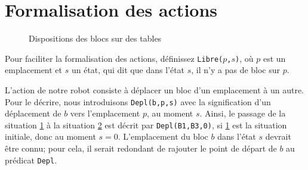 \section{Formalisation des actions}\label{sec:form_act}

\begin{figure}[h]
\begin{subfigure}[b]{0.5\textwidth}
\centering
{}
\caption{}\label{fig:ex3}
\end{subfigure}%
%
\begin{subfigure}[b]{0.5\textwidth}
\centering
{}
\caption{}\label{fig:ex4}
\end{subfigure}%
%
\caption{Dispositions des blocs sur des tables}\label{fig:blocs_tables1}
\end{figure}


\begin{exo}\label{ex:libre}
Pour faciliter la formalisation des actions, définissez 
  \texttt{Libre($p$,$s$)}, où $p$ est un emplacement et $s$ un état, qui dit que
  dans l'état $s$, il n'y a pas de bloc sur $p$. 
\end{exo}

L'action de notre robot consiste à déplacer un bloc d'un emplacement à un
autre. Pour le décrire, nous introduisons \texttt{Depl(b,p,s)} avec la signification d'un déplacement de $b$ vers l'emplacement $p$, au
moment $s$. Ainsi, le passage de la situation \ref{fig:ex3} à la situation
\ref{fig:ex4} est décrit par \texttt{Depl(B1,B3,0)}, si \ref{fig:ex3} est
la situation initiale, donc au moment $s = 0$.
L'emplacement du bloc $b$ dans l'état $s$ devrait être connu; pour
cela, il serait redondant de rajouter le point de départ de $b$ au prédicat
\texttt{Depl}.

